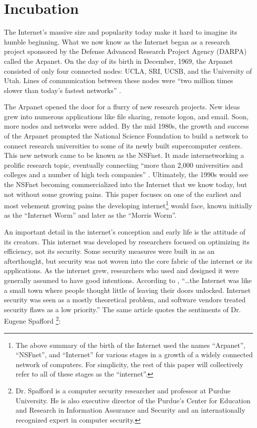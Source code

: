 \section*{Incubation}
\setcounter{page}{1}

The Internet's massive size and popularity today make it hard to imagine its
humble beginning. What we now know as the Internet began as a research project
sponsored by the Defense Advanced Research Project Agency (DARPA) called the
Arpanet. On the day of its birth in December, 1969, the Arpanet consisted of
only four connected nodes: UCLA, SRI, UCSB, and the University of Utah. Lines
of communication between these nodes were ``two million times slower than
today's fastest networks'' \cite{strawn_masterminds_2014}. 

The Arpanet opened the door for a flurry of new research projects. New ideas
grew into numerous applications like file sharing, remote logon, and email. Soon, more
nodes and networks were added. By the mid 1980s, the growth and success
of the Arpanet prompted the National Science Foundation to build a network to
connect research universities to some of its newly built supercomputer centers. 
This new network came to be known as the NSFnet.
It made internetworking a prolific research topic,
eventually connecting ``more than 2,000 universities and colleges and a
number of high tech companies'' \cite{strawn_masterminds_2014}. Ultimately, the
1990s would see the NSFnet becoming commercialized into the Internet that we
know today, but not without some growing pains. This paper focuses on one of the
earliest and most vehement growing pains the developing internet\footnote
{
The above summary of the
birth of the Internet used the names ``Arpanet'', ``NSFnet'', and ``Internet''
for various stages in a growth of a widely connected network of computers. For
simplicity, the rest of this paper will collectively refer to all of these
stages as the ``internet''.
} 
would face,
known initially as the ``Internet Worm'' and later as the ``Morris Worm''.


An important detail in the internet's conception and early life is the
attitude of its creators.
This internet was developed by researchers focused on
optimizing its efficiency, not its security. Some security
measures were built in as an afterthought, but security was not woven into
the core fabric of the internet or its applications. As the internet
grew, researchers who used and designed
it were generally assumed to have good intentions. According to
\cite{lee_washpost_2013}, ``\ldots the Internet was like a small town where
people thought little of leaving their doors unlocked. Internet security was
seen as a mostly theoretical problem, and software vendors treated security
flaws as a low priority.'' The same article quotes the sentiments of Dr. Eugene
Spafford \footnote{
Dr. Spafford is a computer security researcher and professor at Purdue
University. He is also executive director of the Purdue's Center for Education
and Research in Information Assurance and Security and an internationally
recognized expert in computer security.}:

